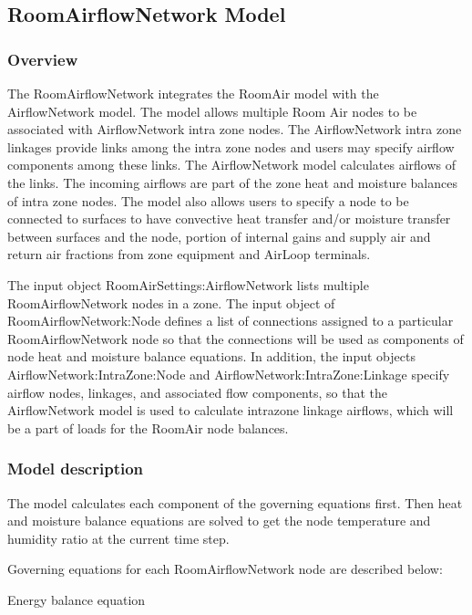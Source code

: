 \subsection{RoomAirflowNetwork Model}\label{roomairflownetwork-model}

\subsubsection{Overview}\label{overview-4-001}

The RoomAirflowNetwork integrates the RoomAir model with the AirflowNetwork model. The model allows multiple Room Air nodes to be associated with AirflowNetwork intra zone nodes. The AirflowNetwork intra zone linkages provide links among the intra zone nodes and users may specify airflow components among these links. The AirflowNetwork model calculates airflows of the links. The incoming airflows are part of the zone heat and moisture balances of intra zone nodes. The model also allows users to specify a node to be connected to surfaces to have convective heat transfer and/or moisture transfer between surfaces and the node, portion of internal gains and supply air and return air fractions from zone equipment and AirLoop terminals.

The input object RoomAirSettings:AirflowNetwork lists multiple RoomAirflowNetwork nodes in a zone. The input object of RoomAirflowNetwork:Node defines a list of connections assigned to a particular RoomAirflowNetwork node so that the connections will be used as components of node heat and moisture balance equations. In addition, the input objects AirflowNetwork:IntraZone:Node and AirflowNetwork:IntraZone:Linkage specify airflow nodes, linkages, and associated flow components, so that the AirflowNetwork model is used to calculate intrazone linkage airflows, which will be a part of loads for the RoomAir node balances.

\subsubsection{Model description}\label{model-description-3-001}

The model calculates each component of the governing equations first. Then heat and moisture balance equations are solved to get the node temperature and humidity ratio at the current time step.

Governing equations for each RoomAirflowNetwork node are described below:

Energy balance equation

